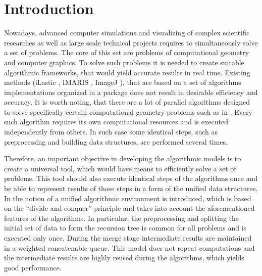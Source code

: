 \documentclass[sigconf]{acmart}
\begin{document}

\maketitle

\section{Introduction}
\label{sec:introduction}

	Nowadays, advanced computer simulations and visualizing of complex scientific researches as well as large scale technical projects requires to simultaneously solve a set of problems. The core of this set are problems of computational geometry and computer graphics. To solve such problems it is needed to create suitable algorithmic frameworks, that would yield accurate results in real time. Existing methods (iLastic \cite{ilastik}, IMARIS \cite{imaris}, ImageJ \cite{imagej}), that are based on a set of algorithms implementations organized in a package does not result in desirable efficiency and accuracy. It is worth noting, that there are a lot of parallel algorithms designed to solve specifically certain computational geometry problems such as in \cite{aggarwal,atallah,cole,amato,chen,berkman,goodman,akl,jaja,leeuwen,reif}. Every such algorithm requires its own computational resources and is executed independently from others. In such case some identical steps, such as preprocessing and building data structures, are performed several times. 

	Therefore, an important objective in developing the algorithmic models is to create a universal tool, which would have means to efficiently solve a set of problems. This tool should also execute identical steps of the algorithms once and be able to represent results of those steps in a form of the unified data structures. In \cite{tereshchenko} the notion of a unified algorithmic environment is introduced, which is based on the ``divide-and-conquer'' principle and takes into account the aforementioned features of the algorithms. In particular, the preprocessing and splitting the initial set of data to form the recursion tree is common for all problems and is executed only once. During the merge stage intermediate results are maintained in a weighted concatenable queue. This model does not repeat computations and the intermediate results are highly reused during the algorithms, which yields good performance.
\end{document}
